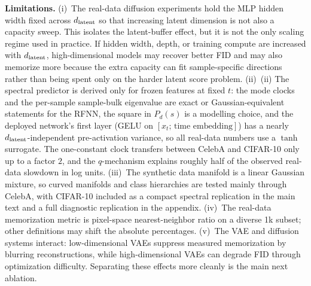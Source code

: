 \textbf{Limitations.}
(i)~The real-data diffusion experiments hold the MLP hidden width
fixed across $d_{\mathrm{latent}}$ so that increasing latent dimension is not also
a capacity sweep. This isolates the latent-buffer effect, but it is
not the only scaling regime used in practice. If hidden width, depth,
or training compute are increased with $d_{\mathrm{latent}}$, high-dimensional
models may recover better FID and may also memorize more because the
extra capacity can fit sample-specific directions rather than being
spent only on the harder latent score problem. (ii)~(ii) The spectral predictor is derived only for frozen features at fixed $t$: the mode clocks and the per-sample sample-bulk eigenvalue are exact or Gaussian-equivalent statements for the RFNN, the square in $P_d(s)$ is a modelling choice, and the deployed network's first layer (GELU on $[x_t;\,\text{time embedding}]$) has a nearly $d_{\mathrm{latent}}$-independent pre-activation variance, so all real-data numbers use a $\tanh$ surrogate. The one-constant clock transfers between CelebA and CIFAR-10 only up to a factor $2$, and the $q$-mechanism explains roughly half of the observed real-data slowdown in log units. (iii)~The synthetic data
manifold is a linear Gaussian
mixture, so curved manifolds and class hierarchies are tested mainly
through CelebA, with CIFAR-10 included as a compact spectral
replication in the main text and a full diagnostic replication in
the appendix.
(iv)~The real-data memorization metric is pixel-space
nearest-neighbor ratio on a diverse 1k subset; other definitions may
shift the absolute percentages. (v)~The VAE and diffusion systems
interact: low-dimensional VAEs suppress measured memorization by
blurring reconstructions, while high-dimensional VAEs can degrade
FID through optimization difficulty. Separating these effects more
cleanly is the main next ablation.
